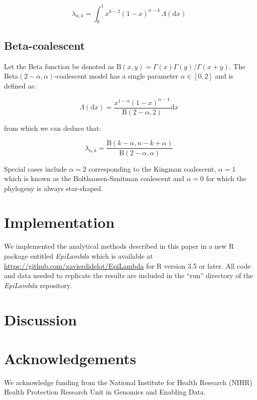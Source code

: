 \documentclass{article}
\begin{document}
\begin{equation}
    \lambda_{n,k} = \int_{0}^{1}{x^{k-2}(1-x)^{n-k}\,\Lambda(\mathrm{d} x)}
\end{equation}

\subsection{Beta-coalescent}

Let the Beta function be denoted as $\mathrm{B}(x,y)=\Gamma(x)\Gamma(y)/\Gamma(x+y)$.
The Beta$(2-\alpha,\alpha)$-coalescent model \citep{schweinsbergCoalescentProcessesObtained2003}
has a single parameter $\alpha \in [0,2]$ and is defined as:

\begin{equation}
\Lambda(\mathrm{d}x)=\frac{x^{1-\alpha}(1-x)^{\alpha-1}}{\mathrm{B}(2-\alpha,2)}\mathrm{d}x
\end{equation}

from which we can deduce that:

\begin{equation}
\lambda_{n,k}=\frac{\mathrm{B}(k-\alpha,n-k+\alpha)}{\mathrm{B}(2-\alpha,\alpha)}
\end{equation}

Special cases include $\alpha=2$ corresponding to the Kingman coalescent,
$\alpha=1$ which is known as the Bolthausen-Sznitman coalescent
and $\alpha=0$ for which the phylogeny is always star-shaped.

\section{Implementation}

We implemented the analytical methods described in this paper in a 
new R package entitled \emph{EpiLambda} which is available
at \url{https://github.com/xavierdidelot/EpiLambda} for R version 3.5 or later. 
All code and data needed to replicate the results are included in the ``run'' directory of the \emph{EpiLambda} repository.

\section{Discussion}

\section*{Acknowledgements}

We acknowledge funding from the National Institute for Health Research (NIHR) Health Protection Research Unit in Genomics and Enabling Data.

\newpage

%

\end{document}
